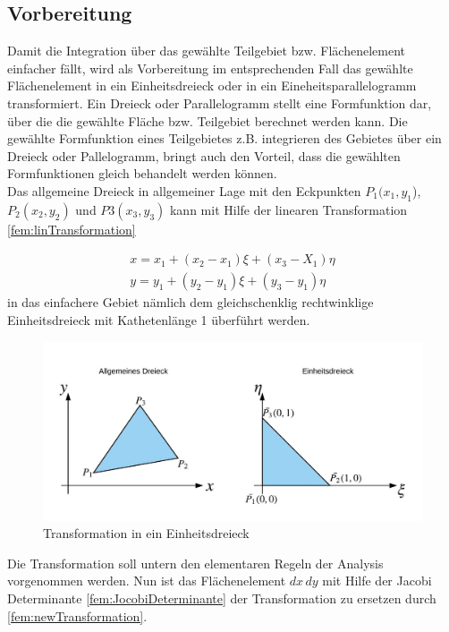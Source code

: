 \subsection{Vorbereitung}

Damit die Integration über das gewählte Teilgebiet bzw. Flächenelement einfacher fällt, wird als Vorbereitung im entsprechenden Fall das gewählte Flächenelement in ein Einheitsdreieck oder in ein Eineheitsparallelogramm transformiert. Ein Dreieck oder Parallelogramm stellt eine Formfunktion dar, über die die gewählte Fläche bzw. Teilgebiet berechnet werden kann. Die gewählte Formfunktion eines Teilgebietes z.B. integrieren des Gebietes über ein Dreieck oder Pallelogramm,  bringt auch den Vorteil, dass die gewählten Formfunktionen gleich behandelt werden können. \\
Das allgemeine Dreieck in allgemeiner Lage mit den Eckpunkten $P_1(x_1, y_1$), $ P_2(x_2, y_2)$ und $P3(x_3,y_3)$ kann mit Hilfe der linearen Transformation \eqref{fem:linTransformation}

\begin{equation}
	\begin{split}
		x = x_1 + (x_2 - x_1)\xi + (x_3 - X_1)\eta \\
		y = y_1 + (y_2 - y_1)\xi + (y_3 - y_1)\eta
		\label{fem:linTransformation}
	\end{split}
\end{equation}
in das einfachere Gebiet nämlich dem gleichschenklig rechtwinklige Einheitsdreieck mit Kathetenlänge 1 überführt werden.


\begin{figure}[h!]
	\centering
	\includegraphics[scale=0.8]{papers/fem/Images/Dreiecke.jpeg}
	\caption{Transformation in ein Einheitsdreieck}
	\label{fig:schemNMR_vorlage}
\end{figure}
Die Transformation soll untern den elementaren Regeln der Analysis vorgenommen werden. Nun ist das Flächenelement $dx \, dy$ mit Hilfe der Jacobi Determinante \eqref{fem:JocobiDeterminante} der Transformation zu ersetzen durch \eqref{fem:newTransformation}.

